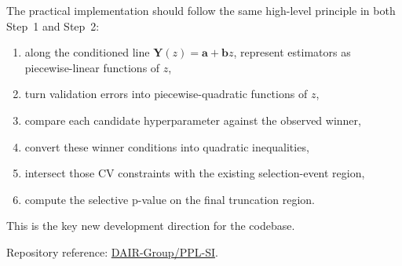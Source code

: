 \documentclass[11pt]{article}
\begin{document}
The practical implementation should follow the same high-level principle in both Step~1 and Step~2:
\begin{enumerate}[leftmargin=2em]
    \item along the conditioned line $\bm{Y}(z) = \bm a + \bm b z$, represent estimators as piecewise-linear functions of $z$,
    \item turn validation errors into piecewise-quadratic functions of $z$,
    \item compare each candidate hyperparameter against the observed winner,
    \item convert these winner conditions into quadratic inequalities,
    \item intersect those CV constraints with the existing selection-event region,
    \item compute the selective p-value on the final truncation region.
\end{enumerate}

This is the key new development direction for the codebase.

\vspace{1em}
\noindent
Repository reference: \href{https://github.com/DAIR-Group/PPL-SI}{DAIR-Group/PPL-SI}.
\end{document}
